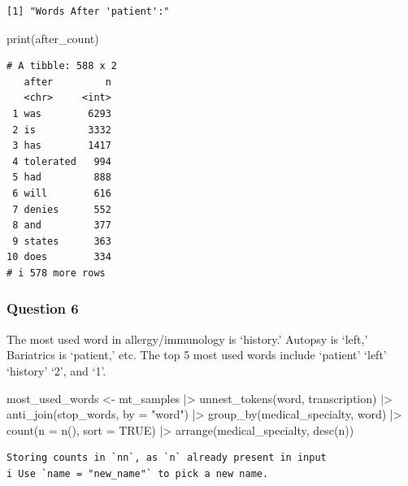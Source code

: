 \documentclass[
  letterpaper,
  DIV=11,
  numbers=noendperiod]{scrartcl}
\newenvironment{Shaded}{\begin{snugshade}}{\end{snugshade}}
\newcommand{\AttributeTok}[1]{\textcolor[rgb]{0.40,0.45,0.13}{#1}}
\newcommand{\ConstantTok}[1]{\textcolor[rgb]{0.56,0.35,0.01}{#1}}
\newcommand{\FunctionTok}[1]{\textcolor[rgb]{0.28,0.35,0.67}{#1}}
\newcommand{\NormalTok}[1]{\textcolor[rgb]{0.00,0.23,0.31}{#1}}
\newcommand{\OtherTok}[1]{\textcolor[rgb]{0.00,0.23,0.31}{#1}}
\newcommand{\SpecialCharTok}[1]{\textcolor[rgb]{0.37,0.37,0.37}{#1}}
\newcommand{\StringTok}[1]{\textcolor[rgb]{0.13,0.47,0.30}{#1}}
\begin{document}
\begin{verbatim}
[1] "Words After 'patient':"
\end{verbatim}

\begin{Shaded}
\begin{Highlighting}[]
\FunctionTok{print}\NormalTok{(after\_count)}
\end{Highlighting}
\end{Shaded}

\begin{verbatim}
# A tibble: 588 x 2
   after         n
   <chr>     <int>
 1 was        6293
 2 is         3332
 3 has        1417
 4 tolerated   994
 5 had         888
 6 will        616
 7 denies      552
 8 and         377
 9 states      363
10 does        334
# i 578 more rows
\end{verbatim}

\subsubsection{Question 6}\label{question-6}

The most used word in allergy/immunology is `history.' Autopsy is
`left,' Bariatrics is `patient,' etc. The top 5 most used words include
`patient' `left' `history' `2', and `1'.

\begin{Shaded}
\begin{Highlighting}[]
\NormalTok{most\_used\_words }\OtherTok{\textless{}{-}}\NormalTok{ mt\_samples }\SpecialCharTok{|\textgreater{}}
  \FunctionTok{unnest\_tokens}\NormalTok{(word, transcription) }\SpecialCharTok{|\textgreater{}}
  \FunctionTok{anti\_join}\NormalTok{(stop\_words, }\AttributeTok{by =} \StringTok{"word"}\NormalTok{) }\SpecialCharTok{|\textgreater{}}
  \FunctionTok{group\_by}\NormalTok{(medical\_specialty, word) }\SpecialCharTok{|\textgreater{}}
  \FunctionTok{count}\NormalTok{(}\AttributeTok{n =} \FunctionTok{n}\NormalTok{(), }\AttributeTok{sort =} \ConstantTok{TRUE}\NormalTok{) }\SpecialCharTok{|\textgreater{}}
  \FunctionTok{arrange}\NormalTok{(medical\_specialty, }\FunctionTok{desc}\NormalTok{(n))   }
\end{Highlighting}
\end{Shaded}

\begin{verbatim}
Storing counts in `nn`, as `n` already present in input
i Use `name = "new_name"` to pick a new name.
\end{verbatim}
\end{document}
